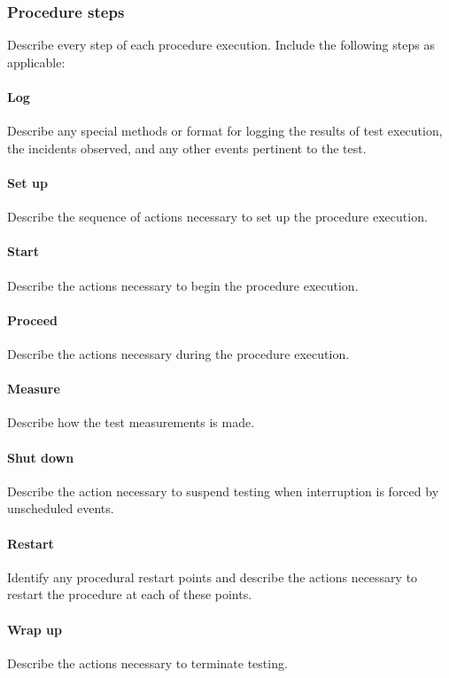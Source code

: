 \documentclass[DM,lsstdraft,STS,toc]{lsstdoc}
\begin{document}
\subsubsection{Procedure steps \label{sect:proc_steps}}
Describe every step of each procedure execution. Include the following steps as applicable:
\paragraph{Log \label{sect:proc_log}}
Describe any special methods or format for logging the results of test execution, the incidents observed, and any other events
pertinent to the test.
\paragraph{Set up \label{sect:proc_setup}}
Describe the sequence of actions necessary to set up the procedure execution.
\paragraph{Start \label{sect:proc_start}}
Describe the actions necessary to begin the procedure execution.
\paragraph{Proceed \label{sect:proc_proceed}}
Describe the actions necessary during the procedure execution.
\paragraph{Measure \label{sect:proc_measure}}
Describe how the test measurements is made.
\paragraph{Shut down \label{sect:proc_shutdown}}
Describe the action necessary to suspend testing when interruption is forced by unscheduled events.
\paragraph{Restart \label{sect:proc_restart}}
Identify any procedural restart points and describe the actions necessary to restart the procedure at each of these points.
\paragraph{Wrap up \label{sect:proc_wrapup}}
Describe the actions necessary to terminate testing.
\end{document}
